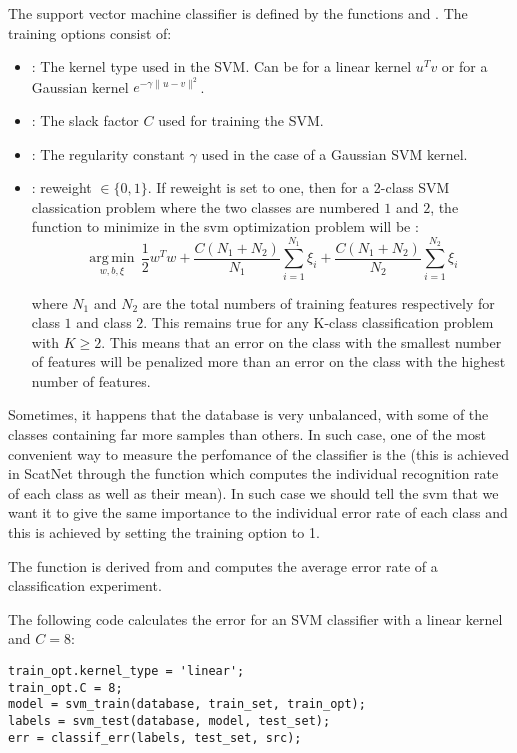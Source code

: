 \documentclass{article}
\begin{document}
The support vector machine classifier is defined by the functions  and . The training options consist of:
\begin{itemize}
	\item {}: The kernel type used in the SVM. Can be  for a linear kernel $u^Tv$ or  for a Gaussian kernel $e^{-\gamma\|u-v\|^2}$.
	\item {}: The slack factor $C$ used for training the SVM.
	\item {}: The regularity constant $\gamma$ used in the case of a Gaussian SVM kernel.
    \item {}: reweight $\in \{0,1\}$. If reweight is set to one, then for a 2-class SVM classication problem where the two classes are numbered $1$ and $2$, the function to minimize in the svm optimization problem will be :
    \begin{equation*}
        \operatorname*{arg\,min}_{w,b,\xi} \, \frac{1}{2}w^{T}w + \frac{C(N_1+N_2)}{N_1}\sum_{i=1}^{N_1}\xi_i +  \frac{C(N_1 + N_2)}{N_2}\sum_{i=1}^{N_2}\xi_i
    \end{equation*}
    
    where $N_1$ and $N_2$ are the total numbers of training features respectively for class $1$ and class $2$. This remains true for any K-class classification problem with $K \geq 2$. This means
    that an error on the class with the smallest number of features will be penalized more than an error
    on the class with the highest number of features.
  \end{itemize}  
    Sometimes, it happens that the database is very unbalanced, with some of the classes containing far more samples than others. In such case, one of the most convenient way to measure the perfomance of the classifier is the  (this is achieved in ScatNet through the function  which computes the individual recognition rate of each class as well as their mean).   
    In such case we should tell the svm that we want it to give the same importance to the individual error rate of each class and this is achieved by setting the training option  to 1.\par The function  is derived from  and computes the average error rate of a classification experiment.
  

The following code calculates the error for an SVM classifier with a linear kernel and $C = 8$:
\begin{lstlisting}
train_opt.kernel_type = 'linear';
train_opt.C = 8;
model = svm_train(database, train_set, train_opt);
labels = svm_test(database, model, test_set);
err = classif_err(labels, test_set, src);
\end{lstlisting}
\end{document}
